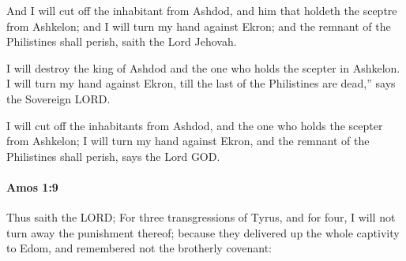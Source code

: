 			\begin{versebox}
					\item[BHS] 
					\item[LXX] 
					\item[ASV] And I will cut off the inhabitant from Ashdod, and him that holdeth the sceptre from Ashkelon; and I will turn my hand against Ekron; and the remnant of the Philistines shall perish, saith the Lord Jehovah.
					\item[NIV] I will destroy the king of Ashdod and the one who holds the scepter in Ashkelon. I will turn my hand against Ekron, till the last of the Philistines are dead,” says the Sovereign LORD.
					\item[NRSV] I will cut off the inhabitants from Ashdod, and the one who holds the scepter from Ashkelon; I will turn my hand against Ekron, and the remnant of the Philistines shall perish, says the Lord GOD.
			\end{versebox}

		\paragraph{Amos 1:9} %
			\label{AMOS-1-9}

			Thus saith the LORD; For three transgressions of Tyrus, and for four, I will not turn away the punishment thereof; because they delivered up the whole captivity to Edom, and remembered not the brotherly covenant:

